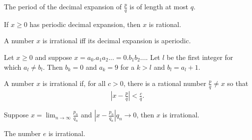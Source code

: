 \documentclass{article}
\begin{document}
\begin{theorem}
    The period of the decimal expansion of $\frac{p}{q}$ is of length at most $q$.
\end{theorem}
\begin{theorem}
    If $x\geq 0$ has periodic decimal expansion, then $x$ is rational.
\end{theorem}
\begin{theorem}
    A number $x$ is irrational iff its decimal expansion is aperiodic.
\end{theorem}
\begin{theorem}
    Let $x\geq 0$ and suppose $x=a_0.a_1a_2...=0.b_1b_2....$ Let $l$ be the first integer for which $a_l\not=b_l$. Then $b_k=0$ and $a_k=9$ for a $k>l$ and $b_l=a_l+1$.
\end{theorem}
\begin{theorem}
    A number $x$ is irrational if, for all $c>0$, there is a rational number $\frac{p}{q}\not=x$ so that
    \begin{align*}
        \left|x-\frac{p}{q}\right|<\frac{c}{q}.
    \end{align*}
\end{theorem}
\begin{theorem}
    Suppose $x=\lim_{n\to\infty}\frac{p_n}{q_n}$ and $\left|x-\frac{p_n}{q_n}\right|q_n \to 0$, then $x$ is irrational.
\end{theorem}
\begin{theorem}
    The number $e$ is irrational.
\end{theorem}
\end{document}
